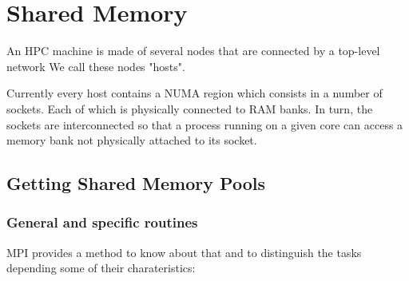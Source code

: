 \section{Shared Memory}

An HPC machine is made of several nodes that are connected by a top-level network We call these nodes "hosts".

Currently every host contains a NUMA region which consists in a number of sockets. Each of which is physically connected to RAM banks.
In turn, the sockets are interconnected so that a process running on a given core can access a memory bank not physically attached to its socket.

\subsection{Getting Shared Memory Pools}

\subsubsection{General and specific routines}

MPI provides a method to know about that and to distinguish the tasks depending some of their charateristics:

